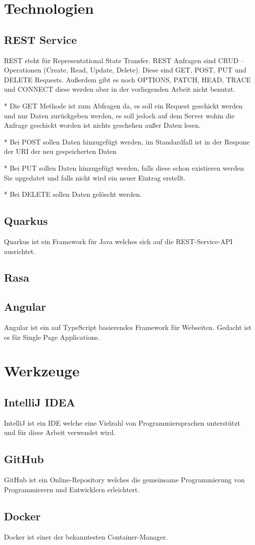 \section{Technologien}

\subsection{REST Service}
REST steht für Representational State Transfer.
REST Anfragen sind CRUD – Operationen (Create, Read, Update, Delete).
Diese sind GET, POST, PUT und DELETE Requests.
Außerdem gibt es noch OPTIONS, PATCH, HEAD, TRACE
und CONNECT diese werden aber in der vorliegenden Arbeit nicht benutzt.

* Die GET Methode ist zum Abfragen da, es soll ein Request geschickt werden und nur Daten zurückgeben werden, es soll jedoch auf dem Server wohin die Anfrage geschickt worden ist nichts geschehen außer Daten lesen.

* Bei POST sollen Daten hinzugefügt werden, im Standardfall ist in der Respone der URI der neu gespeicherten Daten

* Bei PUT sollen Daten hinzugefügt werden, falls diese schon existieren werden Sie upgedatet und falls nicht wird ein neuer Eintrag erstellt.

* Bei DELETE sollen Daten gelöscht werden.

\subsection{Quarkus}\label{quarkus}
Quarkus ist ein Framework für Java welches sich auf die REST-Service-API ausrichtet.

\subsection{Rasa}


\subsection{Angular}
Angular ist ein auf TypeScript basierendes Framework für Webseiten.
Gedacht ist es für Single Page Applications.



\section{Werkzeuge}
\subsection{IntelliJ IDEA}
IntelliJ ist ein IDE welche eine Vielzahl von Programmiersprachen unterstützt und für diese Arbeit verwendet wird.

\subsection{GitHub}
GitHub ist ein Online-Repository welches die gemeinsame Programmierung von Programmierern und Entwicklern erleichtert.

\subsection{Docker}
Docker ist einer der bekanntesten Container-Manager.
